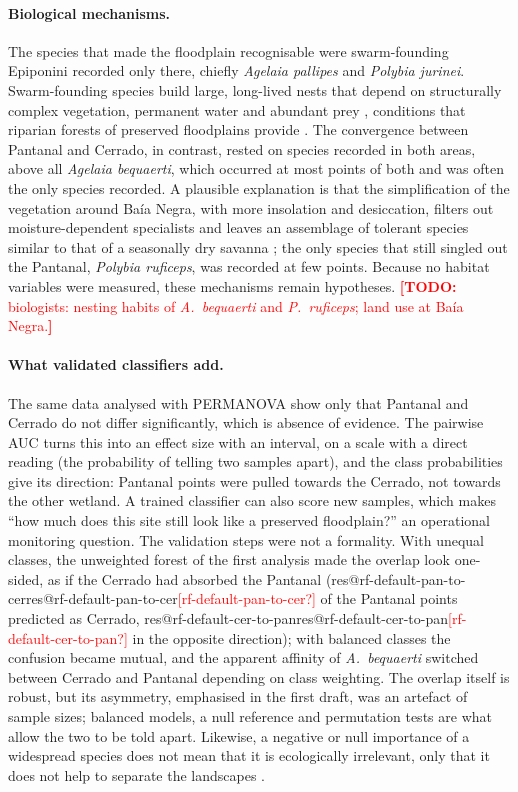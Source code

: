 \documentclass[10pt,a4paper,twocolumn]{article}
\makeatletter
\newif\ifshowtodos \showtodostrue
\newcommand{\TODO}[1]{\ifshowtodos\textcolor{red}{\textbf{[TODO:} #1\textbf{]}}\fi}
\newcommand{\res}[1]{\ifcsname res@#1\endcsname\csname res@#1\endcsname\else\textcolor{red}{[#1?]}\fi}
\newcommand{\taxon}[1]{\textit{#1}}
\makeatother
\begin{document}
\paragraph{Biological mechanisms.}
The species that made the floodplain recognisable were swarm-founding Epiponini recorded only there,
chiefly \taxon{Agelaia pallipes} and \taxon{Polybia jurinei}. Swarm-founding species build large,
long-lived nests that depend on structurally complex vegetation, permanent water and abundant prey
\citep{richards1978,jeanne1991}, conditions that riparian forests of preserved floodplains provide
\citep{decastro2021,leite2026}. The convergence between Pantanal and Cerrado, in contrast, rested on
species recorded in both areas, above all \taxon{Agelaia bequaerti}, which occurred at most points of
both and was often the only species recorded. A plausible explanation is that the simplification of
the vegetation around Baía Negra, with more insolation and desiccation, filters out
moisture-dependent specialists and leaves an assemblage of tolerant species similar to that of a
seasonally dry savanna \citep{jacques2023,francisco2023,almeida2014}; the only species that still
singled out the Pantanal, \taxon{Polybia ruficeps}, was recorded at few points. Because no habitat
variables were measured, these mechanisms remain hypotheses. \TODO{biologists: nesting habits of
\taxon{A.~bequaerti} and \taxon{P.~ruficeps}; land use at Baía Negra.}

\paragraph{What validated classifiers add.}
The same data analysed with PERMANOVA show only that Pantanal and Cerrado do not differ
significantly, which is absence of evidence. The pairwise AUC turns this into an effect size with
an interval, on a scale with a direct reading (the probability of telling two samples apart), and
the class probabilities give its direction: Pantanal points were pulled towards the Cerrado, not
towards the other wetland. A trained classifier can also score new samples, which makes ``how much
does this site still look like a preserved floodplain?'' an operational monitoring question. The
validation steps were not a formality. With unequal classes, the unweighted forest of the first
analysis made the overlap look one-sided, as if the Cerrado had absorbed the Pantanal
(\res{rf-default-pan-to-cer} of the Pantanal points predicted as Cerrado, \res{rf-default-cer-to-pan}
in the opposite direction); with balanced classes the confusion became mutual, and the apparent
affinity of \taxon{A.~bequaerti} switched between Cerrado and Pantanal depending on class weighting.
The overlap itself is robust, but its asymmetry, emphasised in the first draft, was an artefact of
sample sizes; balanced models, a null reference and permutation tests are what allow the two to be
told apart. Likewise, a negative or null importance of a widespread species does not mean that it
is ecologically irrelevant, only that it does not help to separate the landscapes
\citep{strobl2007}.
\end{document}
